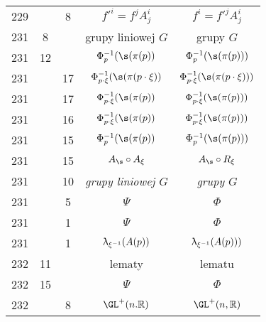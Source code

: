 \documentclass[a4paper,11pt]{article}
\begin{document}
\begin{center}
\begin{tabular}{|c|c|c|c|c|}
    229 & &  8 & $f'^{ i } = f^{ j } A^{ i }_{ j }$ & $f^{ i } = f'^{ j }
                                                      A^{ i }_{ j }$ \\
    231 &  8 & & grupy liniowej $G$ & grupy $G$ \\
    231 & 12 & & $\Phi^{ -1 }_{ p }( \s( \pi( p ) )$
           & $\Phi^{ -1 }_{ p }( \s( \pi( p ) ) )$ \\
    231 & & 17 & $\Phi^{ -1 }_{ p \cdot \xi }( \s( \pi( p \cdot \xi ) )$
           & $\Phi^{ -1 }_{ p \cdot \xi }( \s( \pi( p \cdot \xi ) ) )$ \\
    231 & & 17 & $\Phi^{ -1 }_{ p \cdot \xi }( \s( \pi( p ) )$
           & $\Phi^{ -1 }_{ p \cdot \xi }( \s( \pi( p ) ) )$ \\
    231 & & 16 & $\Phi^{ -1 }_{ p \cdot \xi }( \s( \pi( p ) )$
           & $\Phi^{ -1 }_{ p \cdot \xi }( \s( \pi( p ) ) )$ \\
    231 & & 15 & $\Phi^{ -1 }_{ p }( \s( \pi( p ) )$
           & $\Phi^{ -1 }_{ p }( \s( \pi( p ) ) )$ \\
    231 & & 15 & $A_{ \s } \circ A_{ \xi }$ & $A_{ \s } \circ R_{ \xi }$ \\
    231 & & 10 & \emph{grupy liniowej $G$} & \emph{grupy $G$} \\
    231 & &  5 & $\Psi$ & $\Phi$ \\
    231 & &  1 & $\Psi$ & $\Phi$ \\
    231 & &  1 & $\uplambda_{ \xi^{ -1 } }( A( p ) )$
           & $\uplambda_{ \xi^{ -1 } }( A( p ) ) )$ \\
    232 & 11 & & lematy & lematu \\
    232 & 15 & & $\Psi$ & $\Phi$ \\
    232 & & 8 & $\GL^{ + }( n. \R )$ & $\GL^{ + }( n, \R )$ \\
    \hline
  \end{tabular}


\end{center}
\end{document}
